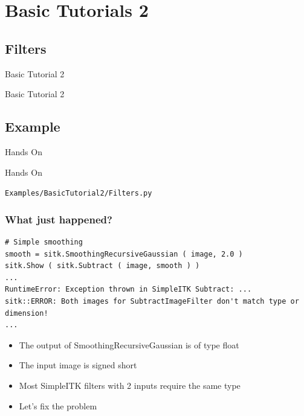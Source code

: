 \section{Basic Tutorials 2}

\subsection{Filters}

\begin{frame}{Basic Tutorial 2}
\fontsize{36pt}{36pt}\selectfont
\center
\begin{center}
Basic Tutorial 2
\end{center}
\end{frame}

\subsection{Example}
\begin{frame}{Hands On}
\fontsize{36pt}{36pt}\selectfont
\center
\begin{center}
Hands On
\end{center}
\vspace{20pt}
\begin{center}
\fontsize{11pt}{11pt}\selectfont
\texttt{Examples/BasicTutorial2/Filters.py}
\end{center}
\end{frame}

\begin{frame}[fragile]
\frametitle{What just happened?}
\lstpython
\begin{lstlisting}
# Simple smoothing
smooth = sitk.SmoothingRecursiveGaussian ( image, 2.0 )
sitk.Show ( sitk.Subtract ( image, smooth ) )
...
RuntimeError: Exception thrown in SimpleITK Subtract: ...
sitk::ERROR: Both images for SubtractImageFilter don't match type or dimension!
...
\end{lstlisting}

\begin{itemize}
  \item The output of SmoothingRecursiveGaussian is of type float
  \item The input image is signed short
  \item Most SimpleITK filters with 2 inputs require the same type
  \item Let's fix the problem
\end{itemize}

\end{frame}

